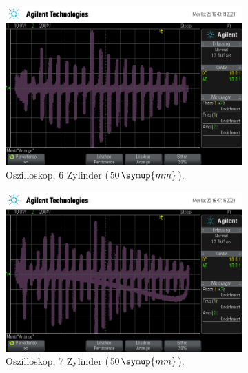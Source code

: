 \begin{figure}
    \centering
    \begin{subfigure}[b]{0.3\textwidth}
        \centering
        \includegraphics[width=\textwidth]{data/1_1zylinder50mm/scope_6.png}
        \caption{Oszilloskop, 6 Zylinder ($50 \, \symup{mm}$).}
    \end{subfigure}
    \hfill
    \begin{subfigure}[b]{0.3\textwidth}
        \centering
        \includegraphics[width=\textwidth]{data/1_1zylinder50mm/scope_7.png}
        \caption{Oszilloskop, 7 Zylinder ($50 \, \symup{mm}$).}
    \end{subfigure}
    \hfill
    \begin{subfigure}[b]{0.3\textwidth}
        \centering

\end{subfigure}
\end{figure}
